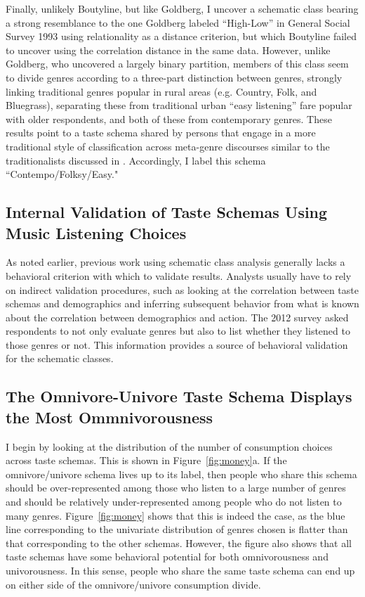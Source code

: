 \documentclass[preprint, authoryear,11pt, 3p]{elsarticle}
\begin{document}
Finally, unlikely Boutyline, but like Goldberg, I uncover a schematic class bearing a strong resemblance to the one Goldberg labeled ``High-Low'' in General Social Survey 1993 using relationality as a distance criterion, but which Boutyline failed to uncover using the correlation distance in the same data. However, unlike Goldberg, who uncovered a largely binary partition, members of this class seem to divide genres according to a three-part distinction between genres, strongly linking traditional genres popular in rural areas (e.g. Country, Folk, and Bluegrass), separating these from traditional urban ``easy listening'' fare popular with older respondents, and both of these from contemporary genres. These results point to a taste schema shared by persons that engage in a more traditional style of classification across meta-genre discourses similar to the traditionalists discussed in \citet{van2001social}. Accordingly, I label this schema ``Contempo/Folksy/Easy."  

\subsection{Internal Validation of Taste Schemas Using Music Listening Choices}
As noted earlier, previous work using schematic class analysis generally lacks a behavioral criterion with which to validate results. Analysts usually have to rely on indirect validation procedures, such as looking at the correlation between taste schemas and demographics \citep{goldberg2011mapping, baldassarri2014neither} and inferring subsequent behavior from what is known about the correlation between demographics and action. The 2012 survey asked respondents to not only evaluate genres but also to list whether they listened to those genres or not. This information provides a source of behavioral validation for the schematic classes. 

\subsection{The Omnivore-Univore Taste Schema Displays the Most Ommnivorousness}
I begin by looking at the distribution of the number of consumption choices across taste schemas. This is shown in Figure~\ref{fig:money}a. If the omnivore/univore schema lives up to its label, then people who share this schema should be over-represented among those who listen to a large number of genres and should be relatively under-represented among people who do not listen to many genres. Figure~\ref{fig:money} shows that this is indeed the case, as the blue line corresponding to the univariate distribution of genres chosen is flatter than that corresponding to the other schemas. However, the figure also shows that all taste schemas have some behavioral potential for both omnivorousness and univorousness. In this sense, people who share the same taste schema can end up on either side of the omnivore/univore consumption divide. 
\end{document}
